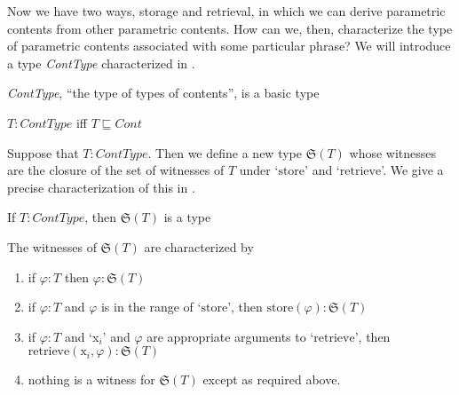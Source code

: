Now we have two ways, storage and retrieval, in which we can derive parametric contents from
other parametric contents.  How can we, then, characterize the type of
parametric contents associated with some particular phrase?  We will introduce a type \textit{ContType}
characterized in \nexteg{}.
\begin{ex} 
\begin{subex} 
 
\item \textit{ContType}, ``the type of types of contents'', is a basic type 
 
\item $T:\textit{ContType}$ iff $T\sqsubseteq\textit{Cont}$ 
 
\end{subex} 
   
\end{ex}
Suppose
that $T:\textit{ContType}$.  Then we define a new type
$\mathfrak{S}(T)$ whose witnesses are the closure of the set of
witnesses of $T$ under `$\mathrm{store}$' and `$\mathrm{retrieve}$'.
We give a precise characterization of this in \nexteg{}.
\begin{ex} 
\begin{subex} 
 
\item If $T:\textit{ContType}$, then $\mathfrak{S}(T)$ is a type 
 
\item The witnesses of $\mathfrak{S}(T)$ are characterized by
  \begin{enumerate} 
 
  \item if $\varphi:T$ then $\varphi:\mathfrak{S}(T)$ 
 
  \item if $\varphi:T$ and $\varphi$ is in the range of `$\mathrm{store}$', then
    $\mathrm{store}(\varphi):\mathfrak{S}(T)$

  \item if $\varphi:T$ and `x$_i$' and $\varphi$ are appropriate
    arguments to `$\mathrm{retrieve}$', then
    $\mathrm{retrieve}(\text{x}_i,\varphi):\mathfrak{S}(T)$
    
  \item nothing is a witness for $\mathfrak{S}(T)$ except as required above.
 
  \end{enumerate} 
  
 
\end{subex} 
\label{ex:storage-type}   
\end{ex}

